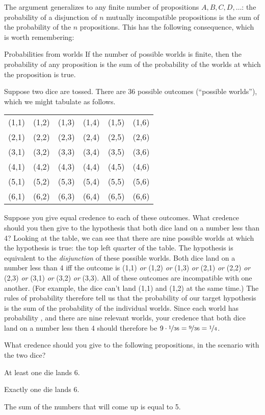 The argument generalizes to any finite number of propositions
$A,B,C,D,\ldots$: the probability of a disjunction of $n$ mutually
incompatible propositions is the sum of the probability of the $n$
propositions. This has the following consequence, which is worth
remembering:

\begin{genericthm}{Probabilities from worlds}
  If the number of possible worlds is finite, then the probability of
  any proposition is the sum of the probability of the worlds at which
  the proposition is true.
\end{genericthm}

Suppose two dice are tossed. There are 36 possible
outcomes (``possible worlds''), which we might tabulate as follows.
%
\begin{center}
\begin{tabular}{cccccc}
  (1,1) & (1,2) & (1,3) & (1,4) & (1,5) & (1,6)\\
  (2,1) & (2,2) & (2,3) & (2,4) & (2,5) & (2,6)\\
  (3,1) & (3,2) & (3,3) & (3,4) & (3,5) & (3,6)\\
  (4,1) & (4,2) & (4,3) & (4,4) & (4,5) & (4,6)\\
  (5,1) & (5,2) & (5,3) & (5,4) & (5,5) & (5,6)\\
  (6,1) & (6,2) & (6,3) & (6,4) & (6,5) & (6,6)
\end{tabular}
\end{center}
%
Suppose you give equal credence  to each of these
outcomes. What credence should you then give to the hypothesis that
both dice land on a number less than 4? Looking at the table, we can
see that there are nine possible worlds at which the hypothesis is
true: the top left quarter of the table. The hypothesis is equivalent
to the \emph{disjunction} of these possible worlds. Both dice land on a
number less than 4 iff the outcome is (1,1) \emph{or} (1,2) \emph{or}
(1,3) \emph{or} (2,1) \emph{or} (2,2) \emph{or} (2,3) \emph{or} (3,1)
\emph{or} (3,2) \emph{or} (3,3). All of these outcomes are
incompatible with one another. (For example, the dice can't land (1,1)
and (1,2) at the same time.) The rules of probability therefore tell us
that the probability of our target hypothesis is the sum of the
probability of the individual worlds. Since each world has probability
, and there are nine relevant worlds, your credence
that both dice land on a number less then 4 should therefore be
$9 \cdot \nicefrac{1}{36} = \nicefrac{9}{36} = \nicefrac{1}{4}$.
\begin{exercise}{1}
  What credence should you give to the following propositions, in the
  scenario with the two dice?
  \begin{exlist}
  \item At least one die lands 6.
  \item Exactly one die lands 6.
  \item The sum of the numbers that will come up is equal to 5.
  \end{exlist}
\end{exercise}

